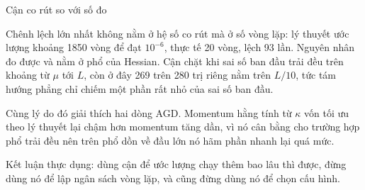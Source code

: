 \documentclass[10pt, aspectratio=169]{beamer}
\begin{document}
\begin{frame}{Cận co rút so với số đo}
{  Chênh lệch lớn nhất không nằm ở hệ số co rút mà ở số vòng lặp: lý thuyết ước
  lượng khoảng 1850 vòng để đạt $10^{-6}$, thực tế 20 vòng, lệch 93 lần. Nguyên
  nhân đo được và nằm ở phổ của Hessian. Cận chặt khi sai số ban đầu trải đều
  trên khoảng từ $\mu$ tới $L$, còn ở đây 269 trên 280 trị riêng nằm trên
  $L/10$, tức tám hướng phẳng chỉ chiếm một phần rất nhỏ của sai số ban đầu.

  Cùng lý do đó giải thích hai dòng AGD. Momentum hằng tính từ $\kappa$ vốn tối
  ưu theo lý thuyết lại chậm hơn momentum tăng dần, vì nó cân bằng cho trường
  hợp phổ trải đều nên trên phổ dồn về đầu lớn nó hãm phần nhanh lại quá mức.

  Kết luận thực dụng: dùng cận để ước lượng chạy thêm bao lâu thì được, đừng
  dùng nó để lập ngân sách vòng lặp, và cũng đừng dùng nó để chọn cấu hình.}
\end{frame}
\end{document}

